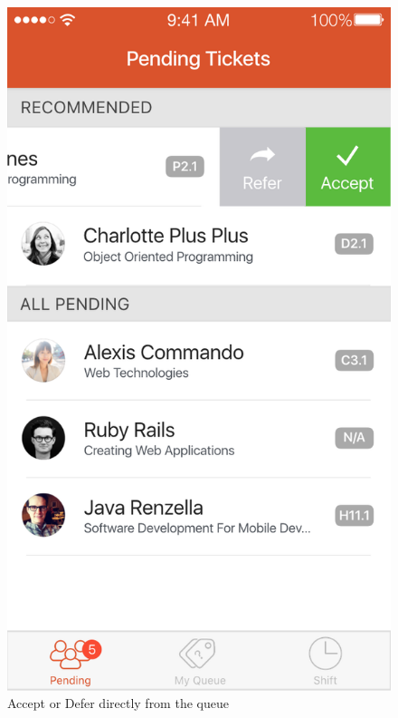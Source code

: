 \documentclass[a4paper,12pt]{article}
\begin{document}
\begin{figure}[p]
\centering
\includegraphics[scale=0.5]{c1f0491270.png}
\caption{Accept or Defer directly from the queue}
\label{2}
\end{figure}
\end{document}
